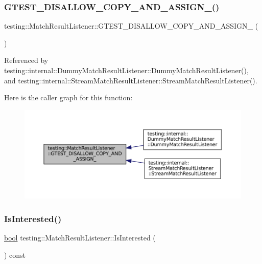 \subsubsection{\texorpdfstring{G\+T\+E\+S\+T\+\_\+\+D\+I\+S\+A\+L\+L\+O\+W\+\_\+\+C\+O\+P\+Y\+\_\+\+A\+N\+D\+\_\+\+A\+S\+S\+I\+G\+N\+\_\+()}{GTEST\_DISALLOW\_COPY\_AND\_ASSIGN\_()}}
{\footnotesize\ttfamily testing\+::\+Match\+Result\+Listener\+::\+G\+T\+E\+S\+T\+\_\+\+D\+I\+S\+A\+L\+L\+O\+W\+\_\+\+C\+O\+P\+Y\+\_\+\+A\+N\+D\+\_\+\+A\+S\+S\+I\+G\+N\+\_\+ (\begin{DoxyParamCaption}\item[{\hyperlink{classtesting_1_1MatchResultListener}{Match\+Result\+Listener}}]{ }\end{DoxyParamCaption})\hspace{0.3cm}{\ttfamily [private]}}



Referenced by testing\+::internal\+::\+Dummy\+Match\+Result\+Listener\+::\+Dummy\+Match\+Result\+Listener(), and testing\+::internal\+::\+Stream\+Match\+Result\+Listener\+::\+Stream\+Match\+Result\+Listener().

Here is the caller graph for this function\+:
\nopagebreak
\begin{figure}[H]
\begin{center}
\leavevmode
\includegraphics[width=350pt]{classtesting_1_1MatchResultListener_ad41af985b372f2d8394e01fd52a1e53d_icgraph}
\end{center}
\end{figure}
\mbox{\label{classtesting_1_1MatchResultListener_ac34f9771f2ba6128cd6a1348b3aebda3}} 
\subsubsection{\texorpdfstring{Is\+Interested()}{IsInterested()}}
{\footnotesize\ttfamily \hyperlink{classbool}{bool} testing\+::\+Match\+Result\+Listener\+::\+Is\+Interested (\begin{DoxyParamCaption}{ }\end{DoxyParamCaption}) const\hspace{0.3cm}{\ttfamily [inline]}}



